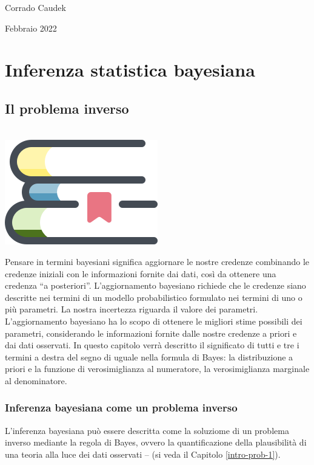 \documentclass[
  10pt,
  italian,
  a4paper,
  extrafontsizes,onecolumn,openright
  ]{memoir}
\newenvironment{mdframedwithfootChapterintro}
{   
    \savenotes
    \begin{mdframed}[%
    topline=true, bottomline=true, linecolor=oiB, linewidth=1.4pt,
    rightline=false, leftline=false,
    backgroundcolor=oiLB]
    \renewcommand{\thempfootnote}{\arabic{footnote}}
    }
{
    \end{mdframed}
    \spewnotes
}
\newenvironment{chapterintro}{
\vspace{4mm}
\begin{mdframedwithfootChapterintro}
\begin{minipage}[t]{0.10\textwidth}
{$\:$ \\ \setkeys{Gin}{width=2.5em,keepaspectratio}\includegraphics{images/_icons/chapterintro.png}}
\end{minipage}
\hfill
\begin{minipage}[t]{0.90\textwidth}
\setlength{\parskip}{1em}
\large
}{\end{minipage}
\end{mdframedwithfootChapterintro}
\vspace{4mm}
}
\theoremstyle{definition}
\theoremstyle{definition}
\theoremstyle{definition}
\theoremstyle{definition}
\theoremstyle{remark}
\begin{document}
\bigskip

Corrado Caudek

\bigskip

Febbraio 2022

\mainmatter

\hypertarget{part-inferenza-statistica-bayesiana}{%
\part*{Inferenza statistica bayesiana}\label{part-inferenza-statistica-bayesiana}}

\hypertarget{chapter-intro-bayes-inference}{%
\chapter{Il problema inverso}\label{chapter-intro-bayes-inference}}

\begin{chapterintro}
Pensare in termini bayesiani significa aggiornare le nostre credenze combinando le credenze iniziali con le informazioni fornite dai dati, così da ottenere una credenza ``a posteriori''. L'aggiornamento bayesiano richiede che le credenze siano descritte nei termini di un modello probabilistico formulato nei termini di uno o più parametri. La nostra incertezza riguarda il valore dei parametri. L'aggiornamento bayesiano ha lo scopo di ottenere le migliori stime possibili dei parametri, considerando le informazioni fornite dalle nostre credenze a priori e dai dati osservati. In questo capitolo verrà descritto il significato di tutti e tre i termini a destra del segno di uguale nella formula di Bayes: la distribuzione a priori e la funzione di verosimiglianza al numeratore, la verosimiglianza marginale al denominatore.

\end{chapterintro}

\hypertarget{inferenza-bayesiana-come-un-problema-inverso}{%
\section{Inferenza bayesiana come un problema inverso}\label{inferenza-bayesiana-come-un-problema-inverso}}

L'inferenza bayesiana può essere descritta come la soluziome di un problema inverso mediante la regola di Bayes, ovvero la quantificazione della plausibilità di una teoria alla luce dei dati osservati -- (si veda il Capitolo \ref{intro-prob-1}).
\end{document}
